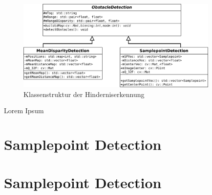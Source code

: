\begin{figure}[h]
	\begin{center}
		\includegraphics[width=10cm]{img/obstacle_detection_structure.pdf}
	\end{center}
	\caption{Klassenstruktur der Hinderniserkennung}
	\label{fig:obstacle_detection_structure}
\end{figure}


Lorem Ipsum
\section{Samplepoint Detection}


\section{Samplepoint Detection}

